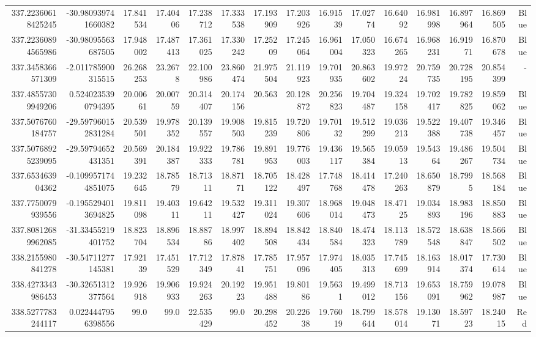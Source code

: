 \begin{center}
\begin{longtable}{rrrrrrrrrrrrrrr}
337.22360618425245 & -30.980939741660382 & 17.841534 & 17.40406 & 17.238712 & 17.333538 & 17.193909 & 17.203926 & 16.91539 & 17.02774 & 16.64092 & 16.981998 & 16.897964 & 16.869505 & Blue \\
337.22360894565986 & -30.98095563687505 & 17.948002 & 17.487413 & 17.361025 & 17.330242 & 17.25209 & 17.245064 & 16.961004 & 17.050323 & 16.674265 & 16.968231 & 16.91971 & 16.870678 & Blue \\
337.3458366571309 & -2.011785900315515 & 26.268253 & 23.2678 & 22.100986 & 23.860474 & 21.975504 & 21.119923 & 19.701935 & 20.863602 & 19.97224 & 20.759735 & 20.728195 & 20.854399 & - \\
337.48557309949206 & 0.5240235390794395 & 20.00661 & 20.00759 & 20.314407 & 20.174156 & 20.563 & 20.128872 & 20.256823 & 19.704487 & 19.324158 & 19.702417 & 19.782825 & 19.859062 & Blue \\
337.5076760184757 & -29.597960152831284 & 20.539501 & 19.978352 & 20.139557 & 19.908503 & 19.815239 & 19.720806 & 19.70132 & 19.512299 & 19.036213 & 19.522388 & 19.407738 & 19.346457 & Blue \\
337.50768925239095 & -29.59794652431351 & 20.569391 & 20.184387 & 19.922333 & 19.786781 & 19.891953 & 19.776003 & 19.436117 & 19.565384 & 19.05913 & 19.54364 & 19.486267 & 19.504734 & Blue \\
337.653463904362 & -0.1099571744851075 & 19.232645 & 18.78579 & 18.71311 & 18.87171 & 18.705122 & 18.428497 & 17.748768 & 18.414478 & 17.240263 & 18.650879 & 18.7995 & 18.568184 & Blue \\
337.7750079939556 & -0.1955294013694825 & 19.811098 & 19.40311 & 19.64211 & 19.532427 & 19.311024 & 19.307606 & 18.968014 & 19.048473 & 18.47125 & 19.034893 & 18.983196 & 18.850883 & Blue \\
337.80812689962085 & -31.33455219401752 & 18.823704 & 18.896534 & 18.88786 & 18.997402 & 18.894508 & 18.842434 & 18.840584 & 18.474323 & 18.113789 & 18.572548 & 18.638847 & 18.566502 & Blue \\
338.2155980841278 & -30.54711277145381 & 17.92139 & 17.451529 & 17.712349 & 17.87841 & 17.785751 & 17.957096 & 17.974405 & 18.035313 & 17.745699 & 18.163914 & 18.017374 & 17.730614 & Blue \\
338.4273343986453 & -30.32651312377564 & 19.926918 & 19.906933 & 19.924263 & 20.19223 & 19.951488 & 19.80186 & 19.5631 & 19.499012 & 18.713156 & 19.653091 & 18.759962 & 19.078987 & Blue \\
338.5277783244117 & 0.0224447956398556 & 99.0 & 99.0 & 22.535429 & 99.0 & 20.298452 & 20.22638 & 19.76019 & 18.799644 & 18.578014 & 19.13071 & 18.59723 & 18.24015 & Red \\

\end{longtable}
\end{center}
